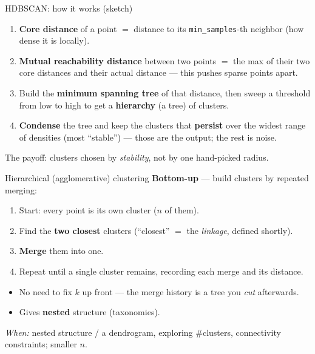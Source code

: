 \documentclass[aspectratio=169]{beamer}
\begin{document}
\begin{frame}{HDBSCAN: how it works (sketch)}
  \begin{enumerate}\small
    \item \textbf{Core distance} of a point $=$ distance to its \texttt{min\_samples}-th neighbor
      (how dense it is locally).
    \item \textbf{Mutual reachability distance} between two points $=$ the max of their two core
      distances and their actual distance --- this pushes sparse points apart.
    \item Build the \textbf{minimum spanning tree} of that distance, then sweep a threshold from
      low to high to get a \textbf{hierarchy} (a tree) of clusters.
    \item \textbf{Condense} the tree and keep the clusters that \textbf{persist} over the widest
      range of densities (most ``stable'') --- those are the output; the rest is noise.
  \end{enumerate}
  \vfill
  \footnotesize The payoff: clusters chosen by \emph{stability}, not by one hand-picked radius.
\end{frame}

\begin{frame}{Hierarchical (agglomerative) clustering}
  \textbf{Bottom-up} --- build clusters by repeated merging:
  \begin{enumerate}\small
    \item Start: every point is its own cluster ($n$ of them).
    \item Find the \textbf{two closest} clusters (``closest'' $=$ the \emph{linkage}, defined shortly).
    \item \textbf{Merge} them into one.
    \item Repeat until a single cluster remains, recording each merge and its distance.
  \end{enumerate}
  \vskip 4pt
  \begin{itemize}\small
    \item No need to fix $k$ up front --- the merge history is a tree you \emph{cut} afterwards.
    \item Gives \textbf{nested} structure (taxonomies).
  \end{itemize}
  \vfill
  \footnotesize \emph{When:} nested structure / a dendrogram, exploring \#clusters, connectivity
  constraints; smaller $n$.
\end{frame}
\end{document}

